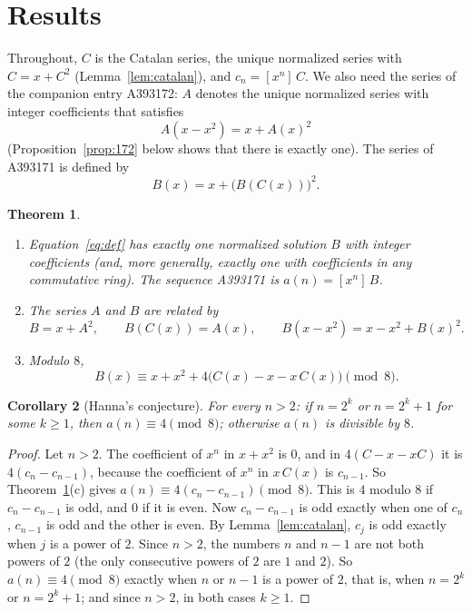 \documentclass[11pt,a4paper]{article}
\newtheorem{theorem}{Theorem}[section]
\newtheorem{corollary}[theorem]{Corollary}
\theoremstyle{definition}
\theoremstyle{remark}
\newcommand{\coeff}[2]{[x^{#1}]\,#2}
\begin{document}
\section{Results}\label{sec:results}

Throughout, $C$ is the Catalan series, the unique normalized series with $C=x+C^2$ (Lemma~\ref{lem:catalan}), and
$c_n=\coeff{n}{C}$. We also need the series of the companion entry A393172: $A$ denotes the unique normalized series with
integer coefficients that satisfies
\begin{equation}\label{eq:first}
A(x-x^2)=x+A(x)^2
\end{equation}
(Proposition~\ref{prop:172} below shows that there is exactly one). The series of A393171 is defined by
\begin{equation}\label{eq:def}
B(x)=x+\bigl(B(C(x))\bigr)^2 .
\end{equation}

\begin{theorem}\label{thm:main}
\begin{enumerate}[label=(\alph*)]
\item Equation~\eqref{eq:def} has exactly one normalized solution $B$ with integer coefficients (and, more generally,
exactly one with coefficients in any commutative ring). The sequence A393171 is $a(n)=\coeff{n}{B}$.
\item The series $A$ and $B$ are related by
\[
B=x+A^2,\qquad B(C(x))=A(x),\qquad B(x-x^2)=x-x^2+B(x)^2 .
\]
\item Modulo $8$,
\[
B(x)\equiv x+x^2+4\bigl(C(x)-x-x\,C(x)\bigr)\pmod 8 .
\]
\end{enumerate}
\end{theorem}

\begin{corollary}[Hanna's conjecture]\label{cor:conj}
For every $n>2$: if $n=2^k$ or $n=2^k+1$ for some $k\ge1$, then $a(n)\equiv4\pmod8$; otherwise $a(n)$ is divisible by
$8$.
\end{corollary}

\begin{proof}
Let $n>2$. The coefficient of $x^n$ in $x+x^2$ is $0$, and in $4(C-x-xC)$ it is $4(c_n-c_{n-1})$, because the
coefficient of $x^n$ in $x\,C(x)$ is $c_{n-1}$. So Theorem~\ref{thm:main}(c) gives $a(n)\equiv4(c_n-c_{n-1})\pmod8$.
This is $4$ modulo $8$ if $c_n-c_{n-1}$ is odd, and $0$ if it is even. Now $c_n-c_{n-1}$ is odd exactly when one of
$c_n$, $c_{n-1}$ is odd and the other is even. By Lemma~\ref{lem:catalan}, $c_j$ is odd exactly when $j$ is a power of
$2$. Since $n>2$, the numbers $n$ and $n-1$ are not both powers of $2$ (the only consecutive powers of $2$ are $1$ and
$2$). So $a(n)\equiv4\pmod8$ exactly when $n$ or $n-1$ is a power of $2$, that is, when $n=2^k$ or $n=2^k+1$; and
since $n>2$, in both cases $k\ge1$.
\end{proof}
\end{document}
